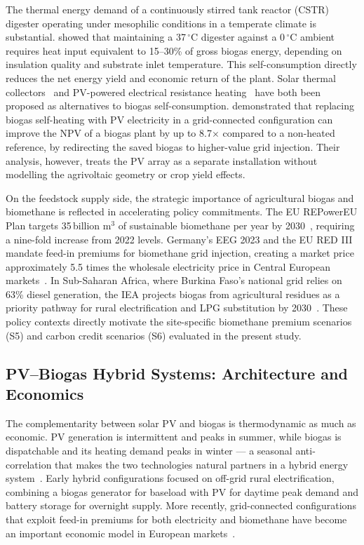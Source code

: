The thermal energy demand of a continuously stirred tank reactor (CSTR)
digester operating under mesophilic conditions in a temperate climate is
substantial. \citet{lindorfer2008} showed that maintaining a 37\,$^{\circ}$C
digester against a 0\,$^{\circ}$C ambient requires heat input equivalent
to 15--30\% of gross biogas energy, depending on insulation quality and
substrate inlet temperature. This self-consumption directly reduces the
net energy yield and economic return of the plant. Solar thermal
collectors~\citep{temiz2024} and PV-powered electrical resistance
heating~\citep{pal2024} have both been proposed as alternatives to
biogas self-consumption. \citet{pal2024} demonstrated that replacing
biogas self-heating with PV electricity in a grid-connected configuration
can improve the NPV of a biogas plant by up to 8.7$\times$ compared to
a non-heated reference, by redirecting the saved biogas to higher-value
grid injection. Their analysis, however, treats the PV array as a
separate installation without modelling the agrivoltaic geometry or crop
yield effects.
 
On the feedstock supply side, the strategic importance of agricultural
biogas and biomethane is reflected in accelerating policy commitments.
The EU REPowerEU Plan targets 35\,billion m$^3$ of sustainable biomethane
per year by 2030~\citep{ec2022}, requiring a nine-fold increase from 2022
levels. Germany's EEG 2023 and the EU RED III mandate feed-in premiums
for biomethane grid injection, creating a market price approximately
5.5 times the wholesale electricity price in Central European
markets~\citep{nikzad2026, eba2025, rabobank2025}. In Sub-Saharan Africa,
where Burkina Faso's national grid relies on 63\% diesel generation, the
IEA projects biogas from agricultural residues as a priority pathway for
rural electrification and LPG substitution by 2030~\citep{iea2025}.
These policy contexts directly motivate the site-specific biomethane
premium scenarios (S5) and carbon credit scenarios (S6) evaluated in the
present study.

\subsection{PV--Biogas Hybrid Systems: Architecture and Economics}

\hspace{1cm}The complementarity between solar PV and biogas is
thermodynamic as much as economic. PV generation is intermittent and
peaks in summer, while biogas is dispatchable and its heating demand
peaks in winter --- a seasonal anti-correlation that makes the two
technologies natural partners in a hybrid energy
system~\citep{pal2024, temiz2024}. Early hybrid configurations
focused on off-grid rural electrification, combining a biogas generator
for baseload with PV for daytime peak demand and battery storage for
overnight supply. More recently, grid-connected configurations that
exploit feed-in premiums for both electricity and biomethane have
become an important economic model in European
markets~\citep{eba2025, nikzad2026}.

